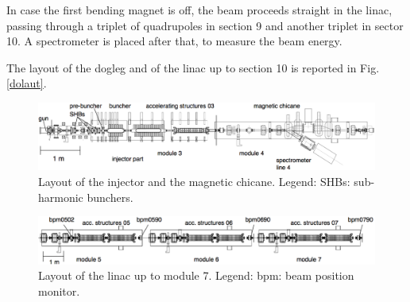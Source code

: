 In case the first bending magnet is off, the beam proceeds straight in the linac, passing through a triplet of quadrupoles in section 9 and another triplet in sector 10. A spectrometer is placed after that, to measure the beam energy. 

The layout of the dogleg and of the linac up to section 10 is reported in Fig. \ref{dolaut}.


\begin{landscape}
\begin{center}

\begin{figure}
\centering 
\includegraphics[width=23cm,keepaspectratio]{pictures/Injector}
\caption{Layout of the injector and the magnetic chicane. Legend: SHBs: sub-harmonic bunchers.\vspace{4mm}}
\label{injlayout}
\end{figure}



\begin{figure}
\centering 
\includegraphics[width=23cm,keepaspectratio]{pictures/girder5-7}
\caption{Layout of the linac up to module 7. Legend: bpm: beam position monitor.}
\label{linaclayout}
\end{figure}

\end{center}
\end{landscape}



